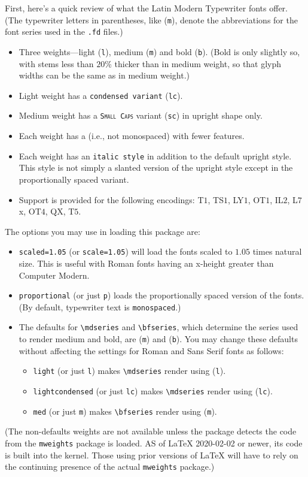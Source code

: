 \documentclass[11pt]{article}
\begin{document}
First, here's a quick review of what the Latin Modern Typewriter fonts offer. (The typewriter letters in parentheses, like ({\tt m}), denote the abbreviations for the font series used in the {\tt.fd} files.)
\begin{itemize}
\item
Three weights---light ({\tt l}), medium ({\tt m}) and bold ({\tt b}). (Bold is only slightly so, with stems less than $20$\% thicker than in medium weight, so that glyph widths can be the same as in medium weight.) 
\item Light weight has a {\tt {}\selectfont condensed variant} ({\tt lc}).
\item Medium weight has a {\tt \textsc{Small Caps}} variant ({\tt sc}) in upright shape only.
\item Each weight has a  (i.e., not monospaced) with fewer features. 
\item Each weight has an {\tt {}\selectfont italic style} in addition to the default upright style. This style is not simply a slanted version of the upright style except in the proportionally spaced variant.
\item Support is provided for the following encodings: T$1$, TS$1$, LY$1$, OT$1$, IL$2$, L$7$x, OT$4$, QX, T$5$.
\end{itemize}
\newpage
The options you may use in loading this package are:
\begin{itemize}
\item {\tt scaled=1.05} (or {\tt scale=1.05}) will load the fonts scaled to $1.05$ times natural size. This is useful with Roman fonts having an x-height greater than Computer Modern.
\item
{\tt proportional} (or just {\tt p}) loads the proportionally spaced version of the fonts. (By default, typewriter text is {\tt monospaced}.)
\item The defaults for \verb|\mdseries| and \verb|\bfseries|, which determine the series used to render medium and bold, are ({\tt m}) and ({\tt b}). You may change these defaults without affecting the settings for Roman and Sans Serif fonts as follows:
\begin{itemize}
\item
{\tt light} (or just {\tt l}) makes \verb|\mdseries|  render using ({\tt l}).
\item
{\tt lightcondensed} (or just {\tt lc}) makes \verb|\mdseries|  render using ({\tt lc}).
\item
{\tt med} (or just {\tt m}) makes \verb|\bfseries| render using ({\tt m}).
\end{itemize}   
\end{itemize}
(The non-defaults weights are not available unless the package detects the code from the {\tt mweights} package is loaded. AS of LaTeX 2020-02-02 or newer, its code is built into the kernel. Those using prior versions of LaTeX will have to rely on the continuing presence of the actual {\tt mweights} package.)
\end{document}
